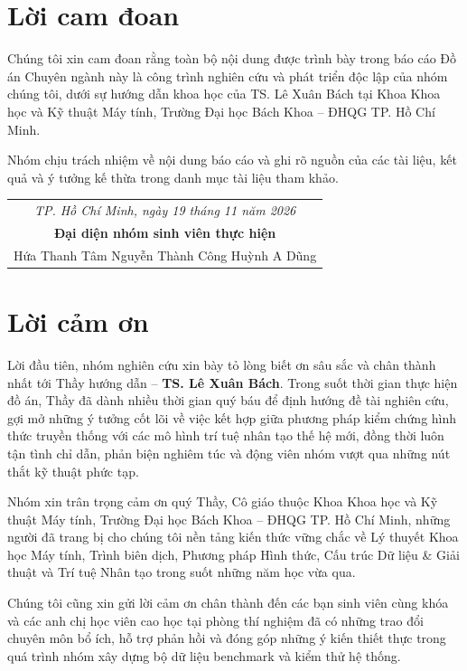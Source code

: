 \chapter*{Lời cam đoan}
Chúng tôi xin cam đoan rằng toàn bộ nội dung được trình bày trong báo cáo Đồ án Chuyên ngành này là công trình nghiên cứu và phát triển độc lập của nhóm chúng tôi, dưới sự hướng dẫn khoa học của TS. Lê Xuân Bách tại Khoa Khoa học và Kỹ thuật Máy tính, Trường Đại học Bách Khoa -- ĐHQG TP. Hồ Chí Minh.

Nhóm chịu trách nhiệm về nội dung báo cáo và ghi rõ nguồn của các tài liệu, kết quả và ý tưởng kế thừa trong danh mục tài liệu tham khảo.

\vspace{1.5cm}
\begin{flushright}
\begin{tabular}{c}
\textit{TP. Hồ Chí Minh, ngày 19 tháng 11 năm 2026} \\
\textbf{Đại diện nhóm sinh viên thực hiện} \\[2cm]
Hứa Thanh Tâm \quad Nguyễn Thành Công \quad Huỳnh A Dũng
\end{tabular}
\end{flushright}

\chapter*{Lời cảm ơn}
Lời đầu tiên, nhóm nghiên cứu xin bày tỏ lòng biết ơn sâu sắc và chân thành nhất tới Thầy hướng dẫn -- \textbf{TS. Lê Xuân Bách}. Trong suốt thời gian thực hiện đồ án, Thầy đã dành nhiều thời gian quý báu để định hướng đề tài nghiên cứu, gợi mở những ý tưởng cốt lõi về việc kết hợp giữa phương pháp kiểm chứng hình thức truyền thống với các mô hình trí tuệ nhân tạo thế hệ mới, đồng thời luôn tận tình chỉ dẫn, phản biện nghiêm túc và động viên nhóm vượt qua những nút thắt kỹ thuật phức tạp.

Nhóm xin trân trọng cảm ơn quý Thầy, Cô giáo thuộc Khoa Khoa học và Kỹ thuật Máy tính, Trường Đại học Bách Khoa -- ĐHQG TP. Hồ Chí Minh, những người đã trang bị cho chúng tôi nền tảng kiến thức vững chắc về Lý thuyết Khoa học Máy tính, Trình biên dịch, Phương pháp Hình thức, Cấu trúc Dữ liệu \& Giải thuật và Trí tuệ Nhân tạo trong suốt những năm học vừa qua.

Chúng tôi cũng xin gửi lời cảm ơn chân thành đến các bạn sinh viên cùng khóa và các anh chị học viên cao học tại phòng thí nghiệm đã có những trao đổi chuyên môn bổ ích, hỗ trợ phản hồi và đóng góp những ý kiến thiết thực trong quá trình nhóm xây dựng bộ dữ liệu benchmark và kiểm thử hệ thống.

